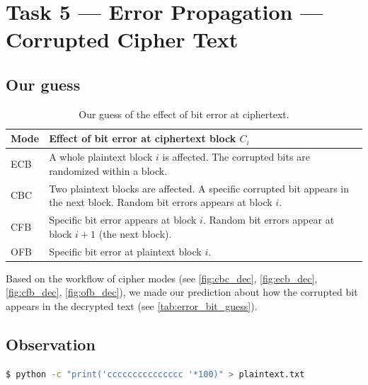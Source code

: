 \section{Task 5 --- Error Propagation --- Corrupted Cipher Text}
\subsection{Our guess}
%
\begin{table}
    \centering
    \begin{tabular}{|l|l|}
        \hline
        Mode & Effect of bit error at ciphertext block \(C_i\)\\
        \hline
        ECB & A whole plaintext block \(i\) is affected. The corrupted bits are randomized
        within a block.\\
        \hline
        CBC & Two plaintext blocks are affected. A specific corrupted bit appears in
        the next block. Random bit errors appears at block \(i\).\\
        \hline
        CFB & Specific bit error appears at block \(i\).
            Random bit errors appear at block \(i+1\) (the next block).\\
        \hline
        OFB & Specific bit error at plaintext block \(i\).\\
        \hline
    \end{tabular}
    \caption{Our guess of the effect of bit error at ciphertext.}
    \label{tab:error_bit_guess}
\end{table}

Based on the workflow of cipher modes (see \autoref{fig:cbc_dec}, \autoref{fig:ecb_dec},
\autoref{fig:cfb_dec}, \autoref{fig:ofb_dec}), we made our prediction about how the corrupted
bit appears in the decrypted text (see \autoref{tab:error_bit_guess}).
\subsection{Observation}
%
\begin{lstlisting}[language=Bash, caption=A script generating {\fontfamily{qcr}
    \selectfont plaintext.txt}., label={lst:plaintext_generation} ]
    $ python -c "print('ccccccccccccccc '*100)" > plaintext.txt
\end{lstlisting}

